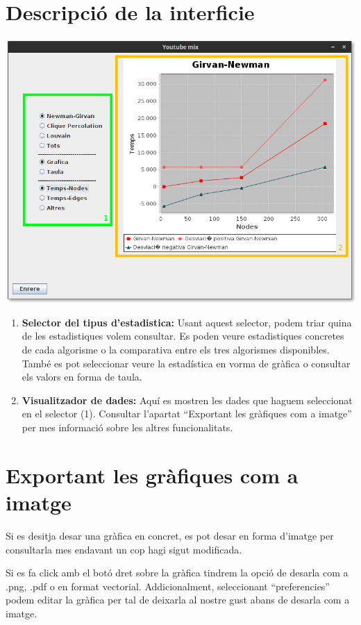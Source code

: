 \documentclass[a4paper,10pt,oneside]{sphinxmanual}
\begin{document}
\section{Descripció de la interficie}
\label{consult_estad:descripcio-de-la-interficie}
\includegraphics{consult_est.png}
\begin{enumerate}
\item {} 
\textbf{Selector del tipus d'estadistica:} Usant aquest selector, podem triar quina de les estadistiques volem consultar. Es poden veure estadistiques concretes de cada algorisme o la comparativa entre els tres algorismes disponibles. També es pot seleccionar veure la estadística en vorma de gràfica o consultar els valors en forma de taula.

\item {} 
\textbf{Visualitzador de dades:} Aquí es mostren les dades que haguem seleccionat en el selector (1). Consultar l'apartat ``Exportant les gràfiques com a imatge'' per mes informació sobre les altres funcionalitats.

\end{enumerate}


\section{Exportant les gràfiques com a imatge}
\label{consult_estad:exportant-les-grafiques-com-a-imatge}
Si es desitja desar una gràfica en concret, es pot desar en forma d'imatge per consultarla mes endavant un cop hagi sigut modificada.

Si es fa click amb el botó dret sobre la gràfica tindrem la opció de desarla com a .png, .pdf o en format vectorial.
Addicionalment, seleccionant ``preferencies'' podem editar la gràfica per tal de deixarla al nostre gust abans de desarla com a imatge.



\renewcommand{\indexname}{Índex}
\printindex
\end{document}
